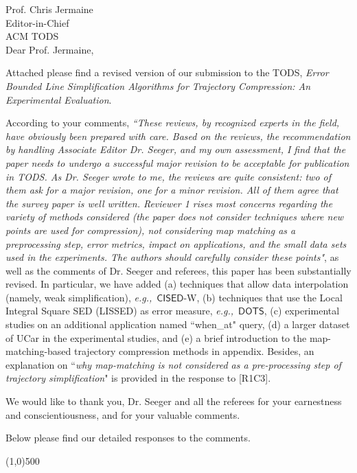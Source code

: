 \documentclass{letter}
\newcommand{\kw}[1]{{\ensuremath {\mathsf{#1}}}\xspace}
\newcommand{\eg}{\emph{e.g.,}\xspace}
\begin{document}
Prof. {Chris Jermaine} \\
Editor-in-Chief		\\
ACM TODS	\\



Dear Prof. Jermaine,

Attached please find a revised version of our submission to
the TODS, \emph{Error Bounded Line Simplification Algorithms for Trajectory Compression: An Experimental Evaluation}.


According to your comments, \emph{``These reviews, by recognized experts in the field, have obviously been prepared with care. Based on the reviews, the recommendation by handling Associate Editor Dr. Seeger, and my own assessment, I find that the paper needs to undergo a successful major revision to be acceptable for publication in TODS. As Dr. Seeger wrote to me, the reviews are quite consistent: two of them ask for a major revision, one for a minor revision. All of them agree that the survey paper is well written. Reviewer 1 rises most concerns regarding the variety of methods considered (the paper does not consider techniques where new points are used for compression), not considering map matching as a preprocessing step, error metrics, impact on applications, and the small data sets used in the experiments. The authors should carefully consider these points"}, as well as the comments of Dr. Seeger and referees, this paper has been substantially revised. In particular, we have added{
	(a) techniques that allow data interpolation (namely, weak simplification), \eg~\kw{CISED}-{W},
	(b) techniques that use the Local Integral Square SED (LISSED) as error measure,  \eg~\kw{DOTS},
	(c) experimental studies on an additional application named ``when\_at" query, 
	(d) a larger dataset of UCar in the experimental studies, and
	(e) a brief introduction to the map-matching-based trajectory compression methods in appendix.}
Besides, an explanation on ``\emph{why map-matching is not considered as a pre-processing step of trajectory simplification}" is provided in the response to {[R1C3]}.


We would like to thank you, Dr. Seeger and all the referees for your earnestness and conscientiousness, and for your valuable comments.

Below please find our detailed responses to the comments.



\line(1,0){500}
\end{document}
